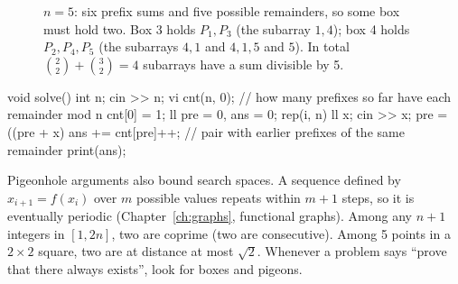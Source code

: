 \begin{figure}[htbp]
\centering
{}
\caption{$n = 5$: six prefix sums and five possible remainders, so some box must hold two. Box 3 holds $P_1, P_3$ (the
subarray $1, 4$); box 4 holds $P_2, P_4, P_5$ (the subarrays $4, 1$ and $4, 1, 5$ and $5$). In total
$\binom22 + \binom32 = 4$ subarrays have a sum divisible by 5.}
\label{fig:pigeonhole}
\end{figure}

\begin{code}
void solve() {
    int n;
    cin >> n;
    vi cnt(n, 0);  // how many prefixes so far have each remainder mod n
    cnt[0] = 1;
    ll pre = 0, ans = 0;
    rep(i, n) {
        ll x;
        cin >> x;
        pre = ((pre + x) %
        ans += cnt[pre]++;  // pair with earlier prefixes of the same remainder
    }
    print(ans);
}
\end{code}

Pigeonhole arguments also bound search spaces. A sequence defined by $x_{i+1} = f(x_i)$ over $m$ possible values repeats
within $m + 1$ steps, so it is eventually periodic (Chapter~\ref{ch:graphs}, functional graphs). Among any $n + 1$ integers
in $[1, 2n]$, two are coprime (two are consecutive). Among 5 points in a $2 \times 2$ square, two are at distance at most
$\sqrt2$. Whenever a problem says ``prove that there always exists'', look for boxes and pigeons.

